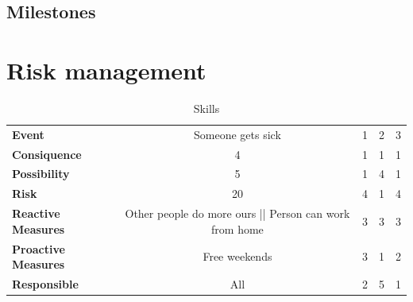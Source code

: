 \documentclass{article}
\newcommand{\ra}[1]{\renewcommand{\arraystretch}{#1}}
\begin{document}
\subsection{Milestones}
\section{Risk management}

\begin{table}\centering \ra{1.3}
    \caption{Skills}
    \label{tab:skills}
    \vspace{2mm}
    \begin{tabular}{lcccc}
    \toprule
									
    \midrule
    \textbf{Event                	 } & Someone gets sick  		       & 1     & 2     & 3     \\ 
    \textbf{Consiquence              } & 4       					       & 1     & 1     & 1     \\ 
    \textbf{Possibility				 } & 5         						   & 1     & 4     & 1     \\ 
    \textbf{Risk                     } & 20        						   & 4     & 1     & 4     \\ 
    \textbf{Reactive Measures        } & Other people do more ours || Person can work from home         & 3     & 3     & 3     \\ 
    \textbf{Proactive Measures       } & Free weekends        			   & 3     & 1     & 2     \\ 
    \textbf{Responsible              } & All        					   & 2     & 5     & 1     \\ 
   
    \bottomrule
    \end{tabular}
\end{table}
\end{document}

